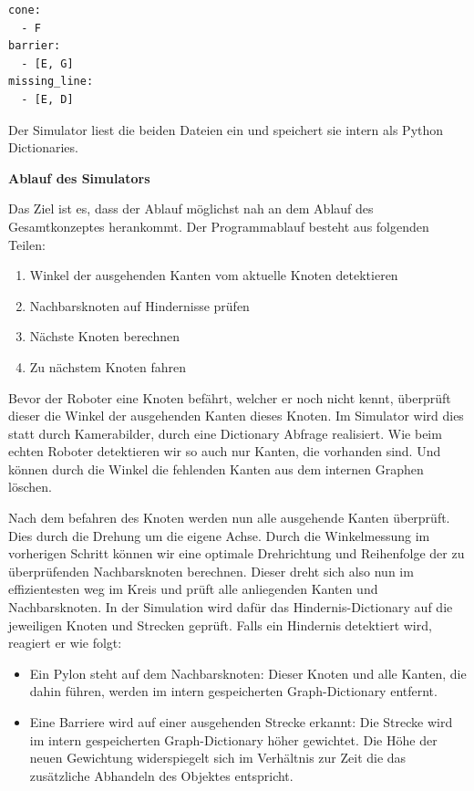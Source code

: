 \begin{verbatim}
cone:
  - F
barrier:
  - [E, G]
missing_line:
  - [E, D]
\end{verbatim}

Der Simulator liest die beiden Dateien ein und speichert sie intern als Python Dictionaries.

\textbf{Ablauf des Simulators}

Das Ziel ist es, dass der Ablauf möglichst nah an dem Ablauf des Gesamtkonzeptes herankommt.
Der Programmablauf besteht aus folgenden Teilen:
\begin{enumerate}
    \item Winkel der ausgehenden Kanten vom aktuelle Knoten detektieren
    \item Nachbarsknoten auf Hindernisse prüfen
    \item Nächste Knoten berechnen
    \item Zu nächstem Knoten fahren
\end{enumerate}

Bevor der Roboter eine Knoten befährt, welcher er noch nicht kennt, überprüft dieser die Winkel der ausgehenden Kanten dieses Knoten. Im Simulator wird dies statt durch Kamerabilder, durch eine Dictionary Abfrage realisiert.
Wie beim echten Roboter detektieren wir so auch nur Kanten, die vorhanden sind. Und können durch die Winkel die fehlenden Kanten aus dem internen Graphen löschen.

Nach dem befahren des Knoten werden nun alle ausgehende Kanten überprüft. Dies durch die Drehung um die eigene Achse. Durch die Winkelmessung im vorherigen Schritt können wir eine optimale Drehrichtung und Reihenfolge der zu überprüfenden Nachbarsknoten berechnen. Dieser dreht sich also nun im effizientesten weg im Kreis und prüft alle anliegenden Kanten und Nachbarsknoten. 
In der Simulation wird dafür das Hindernis-Dictionary auf die jeweiligen Knoten und Strecken geprüft. Falls ein Hindernis detektiert wird, reagiert er wie folgt:

\begin{itemize}
    \item Ein Pylon steht auf dem Nachbarsknoten: Dieser Knoten und alle Kanten, die dahin führen, werden im intern gespeicherten Graph-Dictionary entfernt.
    \item Eine Barriere wird auf einer ausgehenden Strecke erkannt: Die Strecke wird im intern gespeicherten Graph-Dictionary höher gewichtet. Die Höhe der neuen Gewichtung widerspiegelt sich im Verhältnis zur Zeit die das zusätzliche Abhandeln des Objektes entspricht.
\end{itemize}

